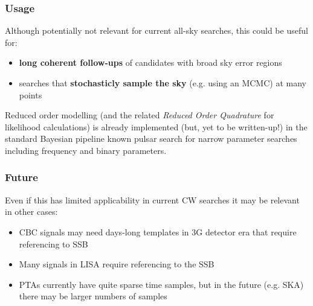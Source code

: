 \begin{frame}

\frametitle{Usage}
\label{usage}

Although potentially not relevant for current all-sky searches, this could be useful for:

\begin{itemize}
\item \textbf{long coherent follow-ups} of candidates with broad sky error regions

\item searches that \textbf{stochasticly sample the sky} (e.g. using an MCMC) at many points

\end{itemize}

Reduced order modelling (and the related \emph{Reduced Order Quadrature} for likelihood calculations)
is already implemented (but, yet to be written-up!) in the standard Bayesian pipeline known pulsar search
for narrow parameter searches including frequency and binary parameters.

\end{frame}

\begin{frame}

\frametitle{Future}
\label{future}

Even if this has limited applicability in current CW searches it may be relevant in other cases:

\begin{itemize}
\item CBC signals may need days-long templates in 3G detector era that require referencing to SSB

\item Many signals in LISA require referencing to the SSB

\item PTAs currently have quite sparse time samples, but in the future (e.g. SKA) there may be larger
 numbers of samples

\end{itemize}

\end{frame}

